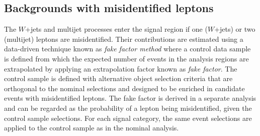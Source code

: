 

\subsection{Backgrounds with misidentified leptons}
\label{subsec:misid-bkg}
The $W$+jets and multijet processes enter the signal region if one ($W$+jets) or two (multijet) leptons are misidentified.
Their contributions are estimated using a data-driven technique known as \emph{fake factor method} where a control data sample is defined from which the expected number of events in the analysis regions are extrapolated by applying an extrapolation factor known as \emph{fake factor}.
The control sample is defined with alternative object selection criteria that are orthogonal to the nominal selections and designed to be enriched in candidate events with misidentified leptons.
The fake factor is derived in a separate analysis and can be regarded as the probability of a lepton being misidentified, given the control sample selections.
For each signal category, the same event selections are applied to the control sample as in the nominal analysis.

